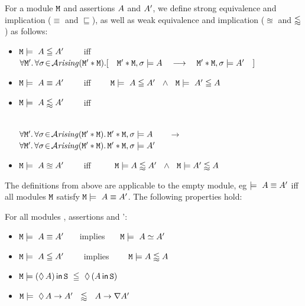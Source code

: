 \documentclass[acmsmall,screen]{acmart}
\begin{document}
\begin{definition}
\label{def:impl:equiv}
\noindent
For a module ${\mbox{\tt{M}}}$  and assertions $A$  and $A'$, we define strong equivalence and implication ($\equiv$ and $\sqsubseteq$), as well
as   weak equivalence and implication ($\approxeq$ and $\lessapprox$)  as follows:


 \begin{itemize}
\item
${\mbox{\tt{M}}}   \models\  A \leqq A'$  \ \ \ \ iff \ \ \ \
$\forall \M'.\, \forall \sigma\!\in\!\Arising(\M'*\M).[\ \ \  \M'*\M, \sigma \models \A \  \ \  \longrightarrow\  \ \  \M'*\M, \sigma \models \A'\ \ \ ]$
 \item
${\mbox{\tt{M}}}   \models\  A \equiv A'$ \ \ \ \ iff \ \ \ \
${\mbox{\tt{M}}}   \models\  A \leqq A'\ \  \wedge \ \  {\mbox{\tt{M}}}   \models\  A' \leqq A$
\item
${\mbox{\tt{M}}}   \models\   A \lessapprox A'$  \ \ \ \ iff \\ \ \ \ \ \ \
\strut  \hspace{1cm}  $\forall {\mbox{\tt{M}}}'.\, \forall \sigma\!\in\!{\mathcal{A}}\textrm{\textit{rising}}({\mbox{\tt{M}}}'*{\mbox{\tt{M}}}).\,{\mbox{\tt{M}}}'*{\mbox{\tt{M}}}, \sigma \models A$ \  \ \  $\longrightarrow$\  \ \
$\forall {\mbox{\tt{M}}}'.\, \forall \sigma\!\in\!{\mathcal{A}}\textrm{\textit{rising}}({\mbox{\tt{M}}}'*{\mbox{\tt{M}}}).\,{\mbox{\tt{M}}}'*{\mbox{\tt{M}}}, \sigma \models A'$
\item
${\mbox{\tt{M}}}   \models\  A \approxeq A'$   \ \ \ \ iff \ \ \ \ \
$ {\mbox{\tt{M}}}  \models  A \lessapprox A' \   \ \wedge\   \  {\mbox{\tt{M}}}  \models  A' \lessapprox A$
 \end{itemize}
\end{definition}

The definitions from above are applicable to the empty module, eg  $\models\  A \equiv A'$ iff   all modules ${\mbox{\tt{M}}}$ satisfy ${\mbox{\tt{M}}} \models\  A \equiv A'$.
The following properties hold:

\begin{lemma}
For all modules \M, assertions \A and \A':

 \begin{itemize}
 \item
${\mbox{\tt{M}}}   \models\  A \equiv A'$  \ \ \ implies \ \ \  ${\mbox{\tt{M}}}   \models\  A \simeq A'$
\item
${\mbox{\tt{M}}}   \models\  A \leqq A'$  \ \ \ \ implies  \ \ \ \
${\mbox{\tt{M}}} \models A \lessapprox A$
\item
$\M \models   \Using{(\Future{\A})}{\prg{S}}\ \strongImplies\ \Future{(\Using{\A} }{\prg{S}})$
\item
$ {\mbox{\tt{M}}} \models\  \lozenge\, A\rightarrow A' \  \  \lessapprox \ \ A\rightarrow\nabla A'$
 \end{itemize}
\end{lemma}
\end{document}
